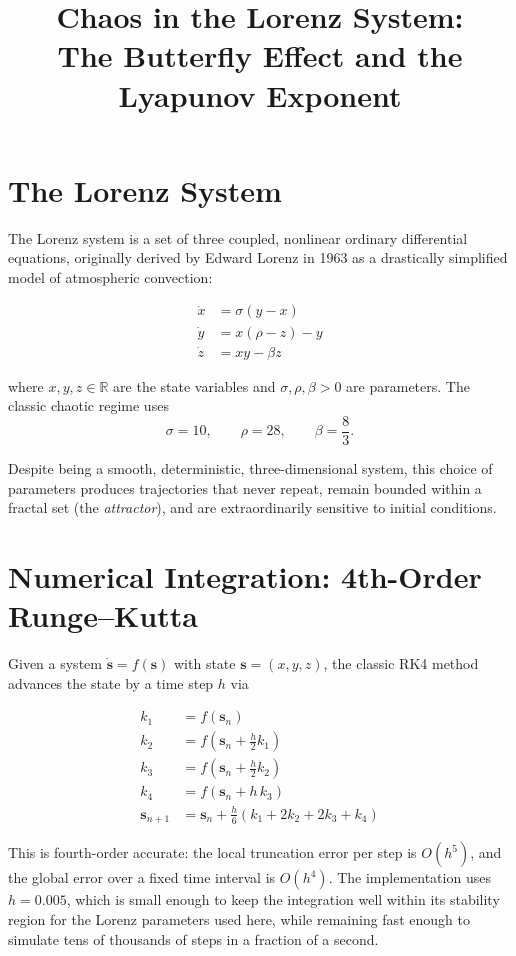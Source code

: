 \documentclass[11pt]{article}
\title{Chaos in the Lorenz System:\\ The Butterfly Effect and the Lyapunov Exponent}
\author{}
\date{}
\begin{document}
\maketitle

\section{The Lorenz System}

The Lorenz system is a set of three coupled, nonlinear ordinary differential
equations, originally derived by Edward Lorenz in 1963 as a drastically
simplified model of atmospheric convection:

\begin{align}
\dot{x} &= \sigma (y - x) \\
\dot{y} &= x(\rho - z) - y \\
\dot{z} &= xy - \beta z
\end{align}

where $x, y, z \in \mathbb{R}$ are the state variables and $\sigma, \rho,
\beta > 0$ are parameters. The classic chaotic regime uses
\[
\sigma = 10, \qquad \rho = 28, \qquad \beta = \frac{8}{3}.
\]

Despite being a smooth, deterministic, three-dimensional system, this choice
of parameters produces trajectories that never repeat, remain bounded within
a fractal set (the \emph{attractor}), and are extraordinarily sensitive to
initial conditions.

\section{Numerical Integration: 4th-Order Runge--Kutta}

Given a system $\dot{\mathbf{s}} = f(\mathbf{s})$ with state
$\mathbf{s} = (x, y, z)$, the classic RK4 method advances the state by a
time step $h$ via

\begin{align}
k_1 &= f(\mathbf{s}_n) \\
k_2 &= f\!\left(\mathbf{s}_n + \tfrac{h}{2} k_1\right) \\
k_3 &= f\!\left(\mathbf{s}_n + \tfrac{h}{2} k_2\right) \\
k_4 &= f(\mathbf{s}_n + h\, k_3) \\
\mathbf{s}_{n+1} &= \mathbf{s}_n + \frac{h}{6}\left(k_1 + 2k_2 + 2k_3 + k_4\right)
\end{align}

This is fourth-order accurate: the local truncation error per step is
$O(h^5)$, and the global error over a fixed time interval is $O(h^4)$. The
implementation uses $h = 0.005$, which is small enough to keep the
integration well within its stability region for the Lorenz parameters used
here, while remaining fast enough to simulate tens of thousands of steps in
a fraction of a second.
\end{document}
